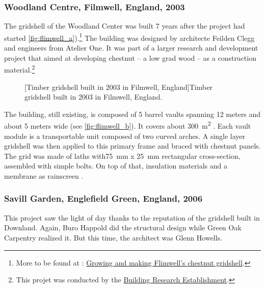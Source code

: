 \subsubsection{Woodland Centre, Filmwell, England, 2003}
The gridshell of the Woodland Center was built 7 years after the project had started \cref{fig:flimwell_a}).\footnote{More to be found at : \href{http://www.fourthdoor.org/annular/?page_id=441}{Growing and making Flimwell’s chestnut gridshell}.} The building was designed by architecte Feilden Clegg and engineers from Atelier One. It was part of a larger research and development project that aimed at developing chestnut -- a low grad wood -- as a construction material.\footnote{This projet was conducted by the \href{http://www.bre.co.uk/}{Building Research Establishment}.}
\begin{figure}[h]
		\hspace*{\fill}
		\vspace{10pt}
		[Timber gridshell built in 2003 in Filmwell, England]{Timber gridshell built in 2003 in Filmwell, England.}
		\label{fig:flimwell} 
\end{figure}

The building, still existing, is composed of 5 barrel vaults spanning 12 meters and about 5 meters wide (see \cref{fig:flimwell_b}). It covers about \SI{300}{m^2} \cite{Lowenstein2004}. Each vault module is a transportable unit composed of two curved arches. A single layer gridshell was then applied to this primary frame and braced with chestnut panels. The grid was made of laths with\SI{75}{mm} x \SI{25}{mm} rectangular cross-section, assembled with simple bolts. On top of that, insulation materials and a membrane as rainscreen \cite{FourthDoor2003}.

\subsubsection{Savill Garden, Englefield Green, England, 2006}

This project saw the light of day thanks to the reputation of the gridshell built in Downland. Again, Buro Happold did the structural design while Green Oak Carpentry realized it. But this time, the architect was Glenn Howells.

